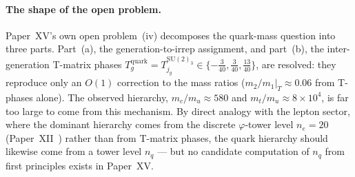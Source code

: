 \documentclass[11pt,a4paper]{article}
\theoremstyle{definition}\newtheorem{definition}[theorem]{Definition}
\theoremstyle{remark}
\theoremstyle{definition}\newtheorem{construction}[theorem]{Construction}
\newcommand{\vp}{\varphi}
\newcommand{\SU}{\mathrm{SU}}
\begin{document}
\paragraph{The shape of the open problem.}
Paper~XV's own open problem~(iv) decomposes the quark-mass question
into three parts. Part~(a), the generation-to-irrep assignment, and
part~(b), the inter-generation T-matrix phases
$T_g^{\mathrm{quark}}=T_{j_g}^{\SU(2)_3}\in\{-\tfrac{3}{40},\tfrac{3}{40},
\tfrac{13}{40}\}$, are resolved: they reproduce only an $O(1)$
correction to the mass ratios ($m_2/m_1|_T\approx0.06$ from T-phases
alone). The observed hierarchy, $m_c/m_u\approx580$ and
$m_t/m_u\approx8\times10^4$, is far too large to come from this
mechanism. By direct analogy with the lepton sector, where the
dominant hierarchy comes from the discrete $\vp$-tower level $n_e=20$
(Paper~XII~\cite{Paper12}) rather than from T-matrix phases, the
quark hierarchy should likewise come from a tower level $n_q$ --- but
no candidate computation of $n_q$ from first principles exists in
Paper~XV.
\end{document}
